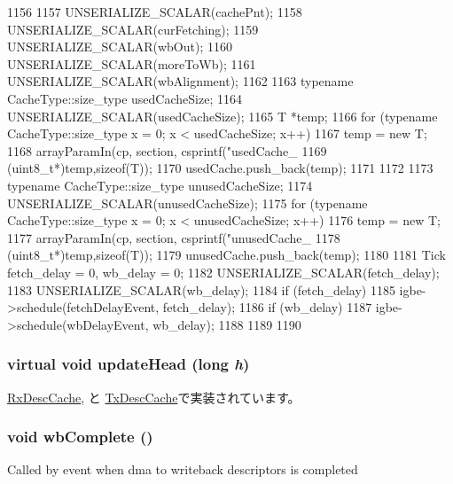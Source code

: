 \begin{DoxyCode}
1156 {
1157     UNSERIALIZE_SCALAR(cachePnt);
1158     UNSERIALIZE_SCALAR(curFetching);
1159     UNSERIALIZE_SCALAR(wbOut);
1160     UNSERIALIZE_SCALAR(moreToWb);
1161     UNSERIALIZE_SCALAR(wbAlignment);
1162 
1163     typename CacheType::size_type usedCacheSize;
1164     UNSERIALIZE_SCALAR(usedCacheSize);
1165     T *temp;
1166     for (typename CacheType::size_type x = 0; x < usedCacheSize; x++) {
1167         temp = new T;
1168         arrayParamIn(cp, section, csprintf("usedCache_%
1169                      (uint8_t*)temp,sizeof(T));
1170         usedCache.push_back(temp);
1171     }
1172 
1173     typename CacheType::size_type unusedCacheSize;
1174     UNSERIALIZE_SCALAR(unusedCacheSize);
1175     for (typename CacheType::size_type x = 0; x < unusedCacheSize; x++) {
1176         temp = new T;
1177         arrayParamIn(cp, section, csprintf("unusedCache_%
1178                      (uint8_t*)temp,sizeof(T));
1179         unusedCache.push_back(temp);
1180     }
1181     Tick fetch_delay = 0, wb_delay = 0;
1182     UNSERIALIZE_SCALAR(fetch_delay);
1183     UNSERIALIZE_SCALAR(wb_delay);
1184     if (fetch_delay)
1185         igbe->schedule(fetchDelayEvent, fetch_delay);
1186     if (wb_delay)
1187         igbe->schedule(wbDelayEvent, wb_delay);
1188 
1189 
1190 }
\end{DoxyCode}
\hypertarget{classIGbE_1_1DescCache_af48912789332a0283480cd85c7197f15}{
\subsubsection[{updateHead}]{\setlength{\rightskip}{0pt plus 5cm}virtual void updateHead (long {\em h})}}
\label{classIGbE_1_1DescCache_af48912789332a0283480cd85c7197f15}


\hyperlink{classIGbE_1_1RxDescCache_a4f8dbb4f64167626cac110753708c55c}{RxDescCache}, と \hyperlink{classIGbE_1_1TxDescCache_a4f8dbb4f64167626cac110753708c55c}{TxDescCache}で実装されています。\hypertarget{classIGbE_1_1DescCache_a4e5412affaf9bee5874dcbdb032659cf}{
\subsubsection[{wbComplete}]{\setlength{\rightskip}{0pt plus 5cm}void wbComplete ()}}
\label{classIGbE_1_1DescCache_a4e5412affaf9bee5874dcbdb032659cf}
Called by event when dma to writeback descriptors is completed 


